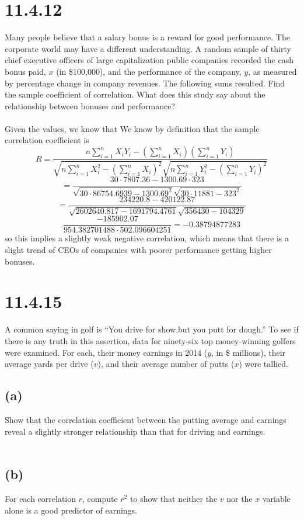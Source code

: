 \documentclass{article}
\begin{document}
{\section*{11.4.12}
Many people believe that a salary bonus is a reward for good performance. The corporate world may have a different understanding. A random sample of thirty chief executive officers of large capitalization public companies recorded the cash bonus paid, \(x\) (in \$100,000), and the performance of the company, \(y\), as measured by percentage change in company revenues. The following sums resulted. Find the sample coefficient of correlation. What does this study say about the relationship between bonuses and performance?
\\
\\
Given the values, we know that We know by definition that the sample correlation coefficient is 
\[
R = \frac{n \sum_{i=1}^{n} X_i Y_i - (\sum_{i=1}^{n} X_i)(\sum_{i=1}^{n}Y_i)}{\sqrt{n \sum_{i=1}^{n} X_i^2 - (\sum_{i=1}^{n} X_i)^2} \sqrt{n\sum_{i=1}^{n}Y_i^2 - (\sum_{i=1}^{n} Y_i)^2}}
\]
\[
= \frac{30 \cdot 7807.36 - 1300.69 \cdot 323}{\sqrt{30 \cdot 86754.6939 - 1300.69^2}\sqrt{30 \cdot 11881 - 323^2}}
\]
\[
= \frac{234220.8 - 420122.87}{\sqrt{2602640.817 - 1691794.4761}\sqrt{356430 - 104329}}
\]
\[
\frac{-185902.07}{954.382701488 \cdot 502.096604251} = -0.38794877283
\]
so this implies a slightly weak negative correlation, which means that there is a slight trend of CEOs of companies with poorer performance getting higher bonuses.

\section*{11.4.15}
A common saying in golf is “You drive for show,but you putt for dough.” To see if there is any truth in this assertion, data for ninety-six top money-winning golfers were examined. For each, their money earnings in 2014 (\(y\), in \$ millions), their average yards per drive (\(v\)), and their average number of putts (\(x\)) were tallied.

\subsection*{(a)} 
Show that the correlation coefficient between the
putting average and earnings reveal a slightly stronger relationship than that for driving and earnings.
\\
\\


\subsection*{(b)} 
For each correlation \(r\), compute \(r^2\) to show that neither the \(v\) nor the \(x\) variable alone is a good predictor of earnings.
\\
\\


}
\end{document}
